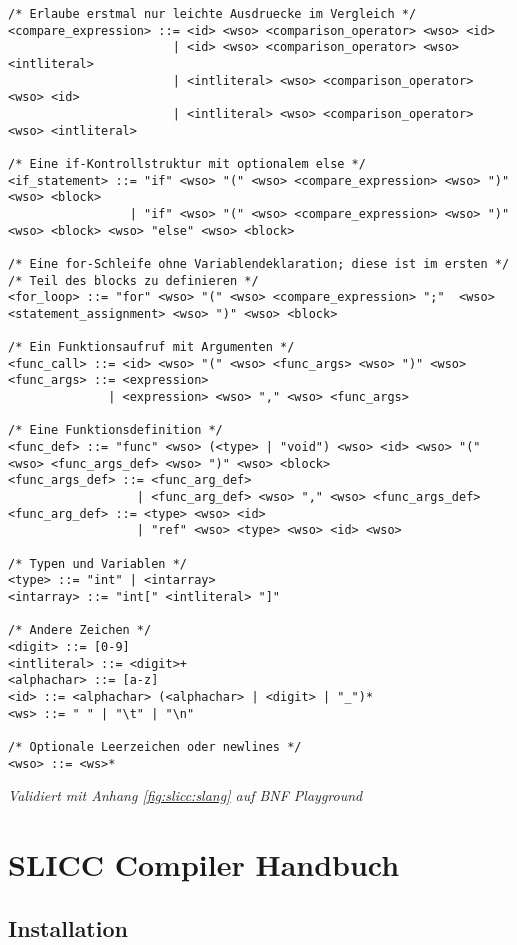 \begin{lstlisting}
/* Erlaube erstmal nur leichte Ausdruecke im Vergleich */
<compare_expression> ::= <id> <wso> <comparison_operator> <wso> <id>
                       | <id> <wso> <comparison_operator> <wso> <intliteral>
                       | <intliteral> <wso> <comparison_operator> <wso> <id>
                       | <intliteral> <wso> <comparison_operator> <wso> <intliteral>

/* Eine if-Kontrollstruktur mit optionalem else */
<if_statement> ::= "if" <wso> "(" <wso> <compare_expression> <wso> ")" <wso> <block>
                 | "if" <wso> "(" <wso> <compare_expression> <wso> ")"  <wso> <block> <wso> "else" <wso> <block>

/* Eine for-Schleife ohne Variablendeklaration; diese ist im ersten */
/* Teil des blocks zu definieren */
<for_loop> ::= "for" <wso> "(" <wso> <compare_expression> ";"  <wso> <statement_assignment> <wso> ")" <wso> <block>

/* Ein Funktionsaufruf mit Argumenten */
<func_call> ::= <id> <wso> "(" <wso> <func_args> <wso> ")" <wso>
<func_args> ::= <expression>
              | <expression> <wso> "," <wso> <func_args>

/* Eine Funktionsdefinition */
<func_def> ::= "func" <wso> (<type> | "void") <wso> <id> <wso> "(" <wso> <func_args_def> <wso> ")" <wso> <block>
<func_args_def> ::= <func_arg_def>
                  | <func_arg_def> <wso> "," <wso> <func_args_def>
<func_arg_def> ::= <type> <wso> <id>
                  | "ref" <wso> <type> <wso> <id> <wso>

/* Typen und Variablen */
<type> ::= "int" | <intarray>
<intarray> ::= "int[" <intliteral> "]"

/* Andere Zeichen */
<digit> ::= [0-9]
<intliteral> ::= <digit>+
<alphachar> ::= [a-z]
<id> ::= <alphachar> (<alphachar> | <digit> | "_")*
<ws> ::= " " | "\t" | "\n"

/* Optionale Leerzeichen oder newlines */
<wso> ::= <ws>*

\end{lstlisting}
\hfil\textit{Validiert mit Anhang \ref{fig:slicc:slang} auf BNF Playground \cite{paulklineBNFPlayground}}\\

\chapter{SLICC Compiler Handbuch}

\section{Installation}

